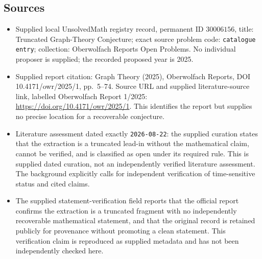 \documentclass[11pt]{article}
\begin{document}
\subsection{Sources}
\begin{itemize}
\item Supplied local UnsolvedMath registry record, permanent ID \(30006156\), title: Truncated Graph-Theory Conjecture; exact source problem code: \texttt{catalogue entry}; collection: Oberwolfach Reports Open Problems. No individual proposer is supplied; the recorded proposed year is 2025.
\item Supplied report citation: Graph Theory (2025), Oberwolfach Reports, DOI 10.4171/owr/2025/1, pp.\ 5--74. Source URL and supplied literature-source link, labelled Oberwolfach Report 1/2025: \url{https://doi.org/10.4171/owr/2025/1}. This identifies the report but supplies no precise location for a recoverable conjecture.
\item Literature assessment dated exactly \texttt{2026-08-22}: the supplied curation states that the extraction is a truncated lead-in without the mathematical claim, cannot be verified, and is classified as open under its required rule. This is supplied dated curation, not an independently verified literature assessment. The background explicitly calls for independent verification of time-sensitive status and cited claims.
\item The supplied statement-verification field reports that the official report confirms the extraction is a truncated fragment with no independently recoverable mathematical statement, and that the original record is retained publicly for provenance without promoting a clean statement. This verification claim is reproduced as supplied metadata and has not been independently checked here.
\end{itemize}
\end{document}
